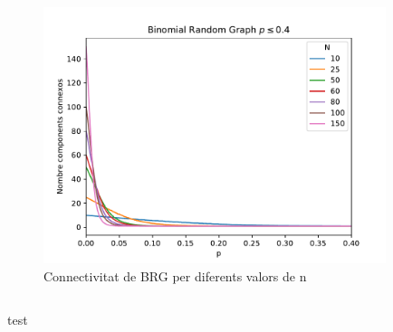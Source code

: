 \begin{figure}[H]
    \centering
    \includegraphics[width=10cm]{plots/bin_mult_2_04.pdf}
    \caption{Connectivitat de BRG per diferents valors de n}
    \label{fig:connect_04}
\end{figure}

\begin{listing}
\inputminted{cpp}{src/graph.h}
\caption{test}
\label{lst:test}
\end{listing}

\pagebreak

\printbibliography


